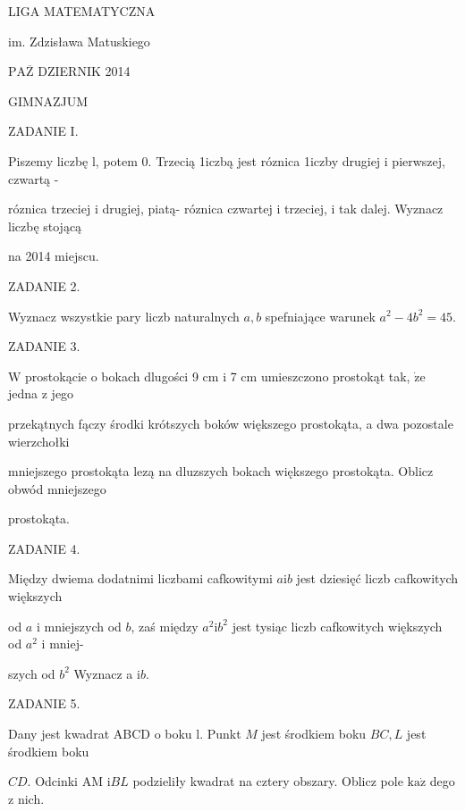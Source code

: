 \documentclass[a4paper,12pt]{article}
\begin{document}
LIGA MATEMATYCZNA

im. Zdzisława Matuskiego

$\mathrm{P}\mathrm{A}\overline{\mathrm{Z}}$ DZIERNIK 2014

GIMNAZJUM

ZADANIE I.

Piszemy liczbę l, potem 0. Trzecią 1iczbą jest róznica 1iczby drugiej i pierwszej, czwartą -

róznica trzeciej i drugiej, piatą- róznica czwartej i trzeciej, i tak dalej. Wyznacz liczbę stojącą

na 2014 miejscu.

ZADANIE 2.

Wyznacz wszystkie pary liczb naturalnych $a, b$ spefniające warunek $a^{2}-4b^{2}=45.$

ZADANIE 3.

$\mathrm{W}$ prostokącie o bokach dlugości 9 cm i 7 cm umieszczono prostokąt tak, $\dot{\mathrm{z}}\mathrm{e}$ jedna z jego

przekątnych fączy środki krótszych boków większego prostokąta, a dwa pozostale wierzchołki

mniejszego prostokąta lezą na dluzszych bokach większego prostokąta. Oblicz obwód mniejszego

prostokąta.

ZADANIE 4.

Między dwiema dodatnimi liczbami cafkowitymi $a\mathrm{i}b$ jest dziesięć liczb cafkowitych większych

od $a$ i mniejszych od $b$, zaś między $a^{2}\mathrm{i}b^{2}$ jest tysiąc liczb cafkowitych większych od $a^{2}$ i mniej-

szych od $b^{2}$ Wyznacz a $\mathrm{i}b.$

ZADANIE 5.

Dany jest kwadrat ABCD o boku l. Punkt $M$ jest środkiem boku $BC, L$ jest środkiem boku

$CD$. Odcinki AM $\mathrm{i}BL$ podzieliły kwadrat na cztery obszary. Oblicz pole $\mathrm{k}\mathrm{a}\dot{\mathrm{z}}$ dego z nich.
\end{document}
